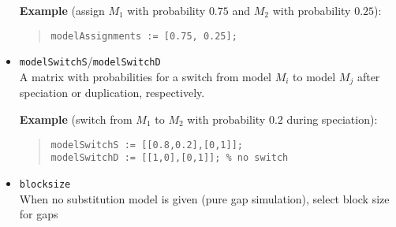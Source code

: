 \documentclass[11pt]{article}
\begin{document}
\begin{itemize}
\noindent \textbf{Example} (assign $M_{1}$ with probability $0.75$ and $M_{2}$ with probability $0.25$):
\begin{quote}
\begin{verbatim}
modelAssignments := [0.75, 0.25];
\end{verbatim}
\end{quote}
\item{\texttt{modelSwitchS}/\texttt{modelSwitchD}} \hfill \\
A matrix with probabilities for a switch from model $M_{i}$ to model $M_{j}$ after speciation or duplication, respectively.

\noindent \textbf{Example} (switch from $M_{1}$ to $M_{2}$ with probability $0.2$ during speciation):
\begin{quote}
\begin{verbatim}
modelSwitchS := [[0.8,0.2],[0,1]];
modelSwitchD := [[1,0],[0,1]]; % no switch
\end{verbatim}
\end{quote}
\item{\texttt{blocksize}} \hfill \\
When no substitution model is given (pure gap simulation), select block size for gaps
\end{itemize}
\end{document}
